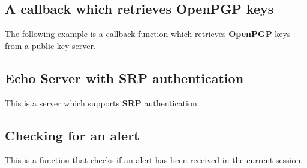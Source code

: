\subsection{A callback which retrieves OpenPGP keys}
The following example is a callback function which retrieves {\bf OpenPGP} keys from
a public key server.


\subsection{Echo Server with SRP authentication}
This is a server which supports {\bf SRP} authentication.


\subsection{Checking for an alert}
This is a function that checks if an alert has been received
in the current session.



